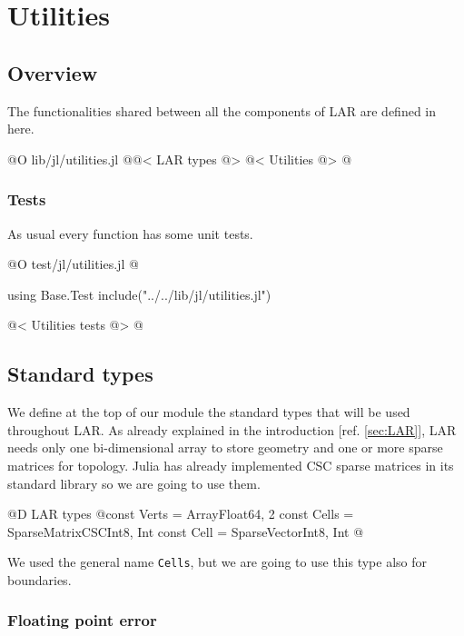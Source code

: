 \chapter{Utilities}
\label{ch:utilities}

\section{Overview}

The functionalities shared between all the components of LAR
are defined in here.

@O lib/jl/utilities.jl
@{@< LAR types @>
@< Utilities @>
@}

\subsection{Tests}
As usual every function has some unit tests.

@O test/jl/utilities.jl
@{using Base.Test
include("../../lib/jl/utilities.jl")

@< Utilities tests @>
@}

\section{Standard types}

We define at the top of our module the standard types
that will be used throughout LAR. As already explained
in the introduction [ref. \ref{sec:LAR}], LAR needs
only one bi-dimensional array to store geometry and 
one or more sparse matrices for topology.
Julia has already implemented CSC sparse matrices in
its standard library so we are going to use them.

@D LAR types
@{const Verts = Array{Float64, 2}
const Cells = SparseMatrixCSC{Int8, Int}
const Cell = SparseVector{Int8, Int}
@}

We used the general name \texttt{Cells}, but
we are going to use this type also for boundaries.

\subsection{Floating point error}
\label{sec:floating-point_error}

